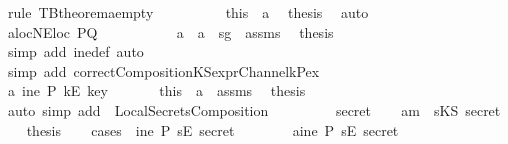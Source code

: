 \begin{isabellebody}
\ {\isacharparenleft}rule\ TBtheorem{}a{\isacharunderscore}empty{\isacharparenright}\ \isanewline
\ \ \ \ \ \ \ \isamarkupfalse%
\ this\ \ a{}\ \isamarkupfalse%
\ {\isacharquery}thesis\ \isamarkupfalse%
\ auto\isanewline
\ \ \ \ \ \isamarkupfalse%
\ \isanewline
\ \ \ \ \ \ \ \isamarkupfalse%
\ a{}{}locNE{\isacharcolon}{\isachardoublequoteopen}loc\ PQ\ {\isasymnoteq}\ {\isacharbraceleft}{\isacharbraceright}{\isachardoublequoteclose}\isanewline
\ \ \ \ \ \ \ \isamarkupfalse%
\ a{}\ \ a{}{}\ \ sg{}\ \ assms\ \isamarkupfalse%
\ {\isacharquery}thesis\isanewline
\ \ \ \ \ \ \ \ \ \isamarkupfalse%
\ {\isacharparenleft}simp\ add{\isacharcolon}\ ine{\isacharunderscore}def{\isacharcomma}\ auto{\isacharparenright}\isanewline
\ \ \ \ \ \ \ \ \ \isamarkupfalse%
\ {\isacharparenleft}simp\ add{\isacharcolon}\ correctCompositionKS{\isacharunderscore}exprChannel{\isacharunderscore}k{\isacharunderscore}Pex{\isacharparenright}\ \isanewline
\ \ \ \ \ \isamarkupfalse%
\isanewline
\ \ \ \isamarkupfalse%
\isanewline
\ \ \ \ \ \isamarkupfalse%
\ a{}{}{\isacharcolon}{\isachardoublequoteopen}{\isasymnot}\ ine\ P\ {\isacharparenleft}kE\ key{\isacharparenright}{\isachardoublequoteclose}\isanewline
\ \ \ \ \ \isamarkupfalse%
\ this\ \ a{}\ \ assms\ \isamarkupfalse%
\ {\isacharquery}thesis\isanewline
\ \ \ \ \ \ \ \isamarkupfalse%
\ {\isacharparenleft}auto{\isacharcomma}\ simp\ add{\isacharcolon}\ \ LocalSecretsComposition{}{\isacharparenright}\isanewline
\ \ \ \isamarkupfalse%
\isanewline
\ \isamarkupfalse%
\isanewline
\ \ \isamarkupfalse%
\ secret\isanewline
\ \ \isamarkupfalse%
\ a{}{\isacharcolon}{\isachardoublequoteopen}m\ {\isacharequal}\ sKS\ secret{\isachardoublequoteclose}\isanewline
\ \ \isamarkupfalse%
\ {\isacharquery}thesis\isanewline
\ \ \isamarkupfalse%
\ {\isacharparenleft}cases\ \ {\isachardoublequoteopen}ine\ P\ {\isacharparenleft}sE\ secret{\isacharparenright}{\isachardoublequoteclose}{\isacharparenright}\ \isanewline
\ \ \ \ \ \isamarkupfalse%
\ a{}{}{\isacharcolon}{\isachardoublequoteopen}ine\ P\ {\isacharparenleft}sE\ secret{\isacharparenright}{\isachardoublequoteclose}\ \isanewline

\end{isabellebody}
